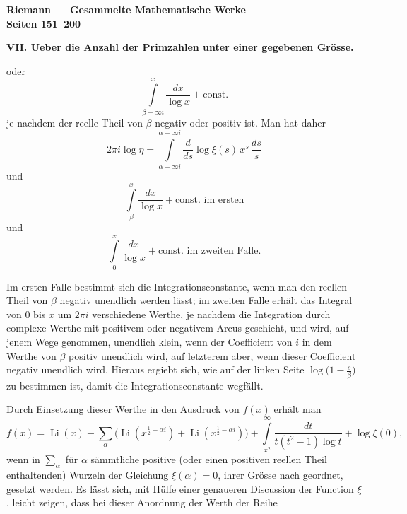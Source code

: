 \documentclass[12pt,a4paper]{article}
\DeclareMathOperator{\Li}{Li}
\begin{document}

\begin{center}
\Large\textbf{Riemann --- Gesammelte Mathematische Werke}\\[0.5em]
\large\textbf{Seiten 151--200}
\end{center}

\vspace{1em}


\noindent\textbf{VII. Ueber die Anzahl der Primzahlen unter einer gegebenen Gr\"osse.}

\bigskip

\noindent oder
\[
\int\limits_{\beta-\infty i}^{x}\frac{dx}{\log x} + \text{const.}
\]
je nachdem der reelle Theil von $\beta$ negativ oder positiv ist. Man hat daher
\[
2\pi i\log\eta = \int\limits_{\alpha-\infty i}^{\alpha+\infty i} \frac{d}{ds}\log\xi(s)\,x^{s}\,\frac{ds}{s}
\]
und
\[
\int\limits_{\beta}^{x}\frac{dx}{\log x} + \text{const. im ersten}
\]
und
\[
\int\limits_{0}^{x}\frac{dx}{\log x} + \text{const. im zweiten Falle.}
\]

Im ersten Falle bestimmt sich die Integrationsconstante, wenn man den reellen Theil von $\beta$ negativ unendlich werden l\"asst; im zweiten Falle erh\"alt das Integral von $0$ bis $x$ um $2\pi i$ verschiedene Werthe, je nachdem die Integration durch complexe Werthe mit positivem oder negativem Arcus geschieht, und wird, auf jenem Wege genommen, unendlich klein, wenn der Coefficient von $i$ in dem Werthe von $\beta$ positiv unendlich wird, auf letzterem aber, wenn dieser Coefficient negativ unendlich wird. Hieraus ergiebt sich, wie auf der linken Seite $\log\bigl(1-\frac{s}{\beta}\bigr)$ zu bestimmen ist, damit die Integrationsconstante wegf\"allt.

Durch Einsetzung dieser Werthe in den Ausdruck von $f(x)$ erh\"alt man
\[
f(x) = \Li(x) - \sum_{\alpha}\bigl(\Li(x^{\frac{1}{2}+\alpha i}) + \Li(x^{\frac{1}{2}-\alpha i})\bigr) + \int\limits_{x^{2}}^{\infty}\frac{dt}{t(t^{2}-1)\log t} + \log\xi(0),
\]
 wenn in $\sum_{\alpha}$ f\"ur $\alpha$ s\"ammtliche positive (oder einen positiven reellen Theil enthaltenden) Wurzeln der Gleichung $\xi(\alpha) = 0$, ihrer Gr\"osse nach geordnet, gesetzt werden. Es l\"asst sich, mit H\"ulfe einer genaueren Discussion der Function $\xi$, leicht zeigen, dass bei dieser Anordnung der Werth der Reihe
\end{document}
